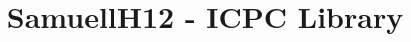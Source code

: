 \documentclass[10pt,a4paper]{article}
\title{\vspace{-4ex}\Large{SamuellH12 - ICPC Library}}
\author{}
\date{}
\begin{document}
\begin{landscape}
\begin{multicols*}{3}  %
\raggedcolumns 
{}

\maketitle
\vspace{-13ex}
\tableofcontents
\pagestyle{fancy}



\end{multicols*}
\end{landscape}
\end{document}
